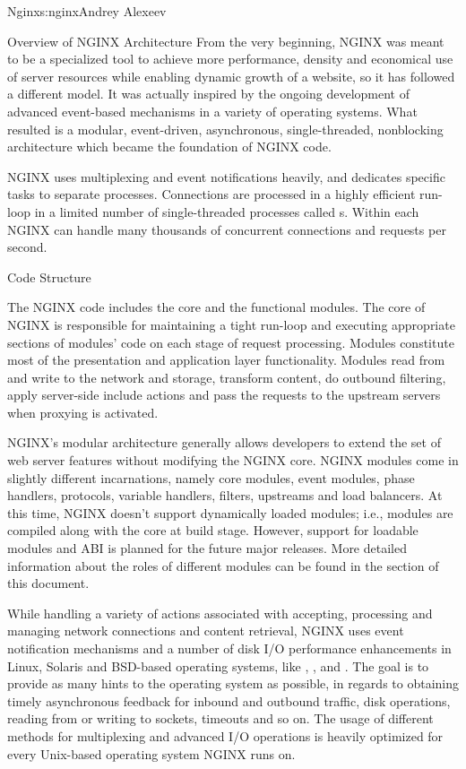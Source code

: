 \begin{aosachapter}{Nginx}{s:nginx}{Andrey Alexeev}
\begin{aosasect1}{Overview of NGINX Architecture}
From the very beginning, NGINX was meant to be a specialized tool to
achieve more performance, density and economical use of server
resources while enabling dynamic growth of a website, so it has
followed a different model. It was actually inspired by the ongoing
development of advanced event-based mechanisms in a variety of
operating systems. What resulted is a modular, event-driven,
asynchronous, single-threaded, nonblocking architecture which became
the foundation of NGINX code.

NGINX uses multiplexing and event notifications heavily, and dedicates
specific tasks to separate processes. Connections are processed in a
highly efficient run-loop in a limited number of single-threaded
processes called s. Within each  NGINX can
handle many thousands of concurrent connections and requests per
second.

\begin{aosasect2}{Code Structure}

The NGINX  code includes the core and the functional
modules. The core of NGINX is responsible for maintaining a tight
run-loop and executing appropriate sections of modules' code on each
stage of request processing. Modules constitute most of the
presentation and application layer functionality. Modules read from
and write to the network and storage, transform content, do outbound
filtering, apply server-side include actions and pass the requests to
the upstream servers when proxying is activated.

NGINX's modular architecture generally allows developers to extend the
set of web server features without modifying the NGINX core. NGINX
modules come in slightly different incarnations, namely core modules,
event modules, phase handlers, protocols, variable handlers, filters,
upstreams and load balancers. At this time, NGINX doesn't support
dynamically loaded modules; i.e., modules are compiled along with the
core at build stage. However, support for loadable modules and ABI is
planned for the future major releases. More detailed information about
the roles of different modules can be found in the
 section of this document.

While handling a variety of actions associated with accepting,
processing and managing network connections and content retrieval,
NGINX uses event notification mechanisms and a number of disk I/O
performance enhancements in Linux, Solaris and BSD-based operating
systems, like , , and . The
goal is to provide as many hints to the operating system as possible,
in regards to obtaining timely asynchronous feedback for inbound and
outbound traffic, disk operations, reading from or writing to sockets,
timeouts and so on. The usage of different methods for multiplexing
and advanced I/O operations is heavily optimized for every Unix-based
operating system NGINX runs on.


\end{aosasect2}
\end{aosasect1}
\end{aosachapter}
